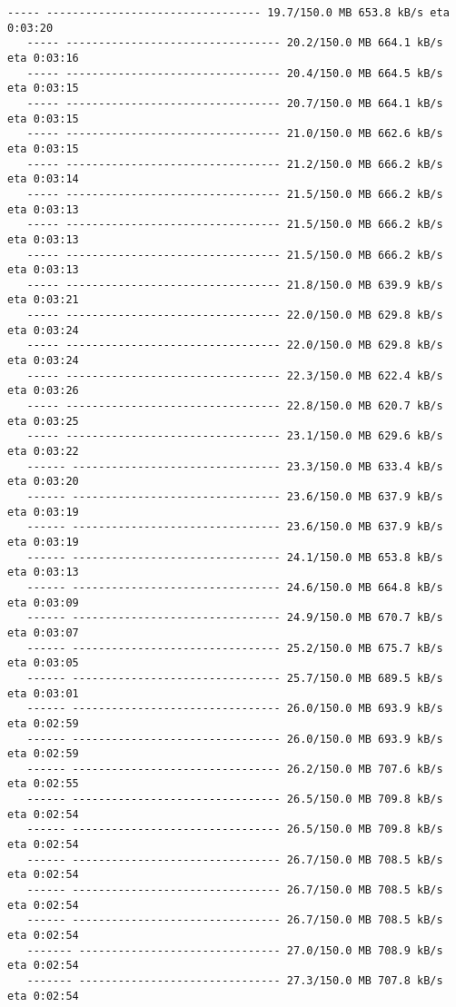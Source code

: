 \documentclass[11pt]{article}
\begin{document}
\begin{Verbatim}[commandchars=\\\{\}]
   ----- --------------------------------- 19.7/150.0 MB 653.8 kB/s eta 0:03:20
   ----- --------------------------------- 20.2/150.0 MB 664.1 kB/s eta 0:03:16
   ----- --------------------------------- 20.4/150.0 MB 664.5 kB/s eta 0:03:15
   ----- --------------------------------- 20.7/150.0 MB 664.1 kB/s eta 0:03:15
   ----- --------------------------------- 21.0/150.0 MB 662.6 kB/s eta 0:03:15
   ----- --------------------------------- 21.2/150.0 MB 666.2 kB/s eta 0:03:14
   ----- --------------------------------- 21.5/150.0 MB 666.2 kB/s eta 0:03:13
   ----- --------------------------------- 21.5/150.0 MB 666.2 kB/s eta 0:03:13
   ----- --------------------------------- 21.5/150.0 MB 666.2 kB/s eta 0:03:13
   ----- --------------------------------- 21.8/150.0 MB 639.9 kB/s eta 0:03:21
   ----- --------------------------------- 22.0/150.0 MB 629.8 kB/s eta 0:03:24
   ----- --------------------------------- 22.0/150.0 MB 629.8 kB/s eta 0:03:24
   ----- --------------------------------- 22.3/150.0 MB 622.4 kB/s eta 0:03:26
   ----- --------------------------------- 22.8/150.0 MB 620.7 kB/s eta 0:03:25
   ----- --------------------------------- 23.1/150.0 MB 629.6 kB/s eta 0:03:22
   ------ -------------------------------- 23.3/150.0 MB 633.4 kB/s eta 0:03:20
   ------ -------------------------------- 23.6/150.0 MB 637.9 kB/s eta 0:03:19
   ------ -------------------------------- 23.6/150.0 MB 637.9 kB/s eta 0:03:19
   ------ -------------------------------- 24.1/150.0 MB 653.8 kB/s eta 0:03:13
   ------ -------------------------------- 24.6/150.0 MB 664.8 kB/s eta 0:03:09
   ------ -------------------------------- 24.9/150.0 MB 670.7 kB/s eta 0:03:07
   ------ -------------------------------- 25.2/150.0 MB 675.7 kB/s eta 0:03:05
   ------ -------------------------------- 25.7/150.0 MB 689.5 kB/s eta 0:03:01
   ------ -------------------------------- 26.0/150.0 MB 693.9 kB/s eta 0:02:59
   ------ -------------------------------- 26.0/150.0 MB 693.9 kB/s eta 0:02:59
   ------ -------------------------------- 26.2/150.0 MB 707.6 kB/s eta 0:02:55
   ------ -------------------------------- 26.5/150.0 MB 709.8 kB/s eta 0:02:54
   ------ -------------------------------- 26.5/150.0 MB 709.8 kB/s eta 0:02:54
   ------ -------------------------------- 26.7/150.0 MB 708.5 kB/s eta 0:02:54
   ------ -------------------------------- 26.7/150.0 MB 708.5 kB/s eta 0:02:54
   ------ -------------------------------- 26.7/150.0 MB 708.5 kB/s eta 0:02:54
   ------- ------------------------------- 27.0/150.0 MB 708.9 kB/s eta 0:02:54
   ------- ------------------------------- 27.3/150.0 MB 707.8 kB/s eta 0:02:54

\end{Verbatim}
\end{document}
